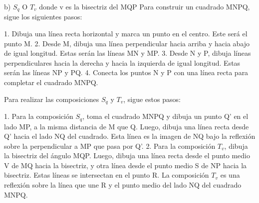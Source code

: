\documentclass{article}
\begin{document}
b) $S_q$ O $T_v$ donde v es la bisectriz del MQP
Para construir un cuadrado MNPQ, sigue los siguientes pasos:

1. Dibuja una línea recta horizontal y marca un punto en el centro. Este será el punto M.
2. Desde M, dibuja una línea perpendicular hacia arriba y hacia abajo de igual longitud. Estas serán las líneas MN y MP.
3. Desde N y P, dibuja líneas perpendiculares hacia la derecha y hacia la izquierda de igual longitud. Estas serán las líneas NP y PQ.
4. Conecta los puntos N y P con una línea recta para completar el cuadrado MNPQ.

Para realizar las composiciones $S_q$ y $T_v$, sigue estos pasos:

1. Para la composición $S_q$, toma el cuadrado MNPQ y dibuja un punto Q' en el lado MP, a la misma distancia de M que Q. Luego, dibuja una línea recta desde Q' hacia el lado NQ del cuadrado. Esta línea es la imagen de NQ bajo la reflexión sobre la perpendicular a MP que pasa por Q'.
2. Para la composición $T_v$, dibuja la bisectriz del ángulo MQP. Luego, dibuja una línea recta desde el punto medio V de MQ hacia la bisectriz, y otra línea desde el punto medio S de NP hacia la bisectriz. Estas líneas se intersectan en el punto R. La composición $T_v$ es una reflexión sobre la línea que une R y el punto medio del lado NQ del cuadrado MNPQ.
\end{document}
